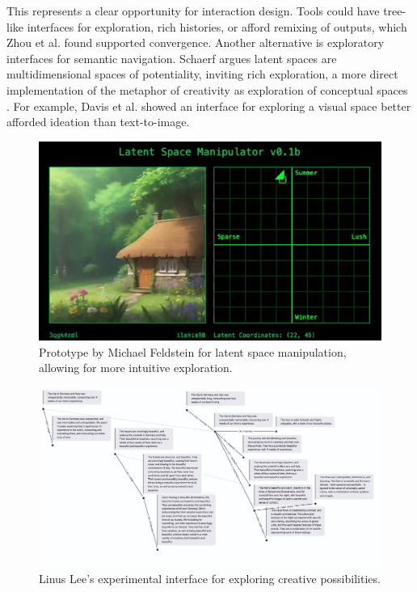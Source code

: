 This represents a clear opportunity for interaction design. Tools could have tree-like interfaces for exploration, rich histories, or afford remixing of outputs, which Zhou et al. \cite{Zhou2024-vp} found supported convergence. Another alternative is exploratory interfaces for semantic navigation. Schaerf \cite{Schaerf2024-gf} argues latent spaces are multidimensional spaces of potentiality, inviting rich exploration, a more direct implementation of the metaphor of creativity as exploration of conceptual spaces \cite{Boden2003-hk, Wiggins2019-yj}. For example, Davis et al. \cite{Davis2024-ml} showed an interface for exploring a visual space better afforded ideation than text-to-image.

\begin{figure}[H]
    \centering
    \includegraphics[width=0.8\linewidth]{latentspacemanip.png}
    \caption{Prototype by Michael Feldstein for latent space manipulation, allowing for more intuitive exploration.}
    \label{fig:feldstein}
\end{figure}

\begin{figure}[H]
    \centering
    \includegraphics[width=0.8\linewidth]{linus.png}
    \caption{Linus Lee's experimental interface for exploring creative possibilities.}
    \label{fig:linus}
\end{figure}


